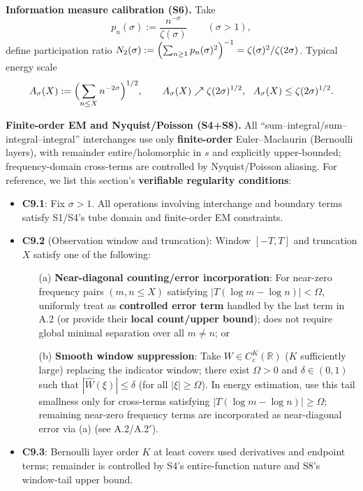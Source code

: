 \documentclass[11pt,a4paper]{article}
\theoremstyle{remark}
\begin{document}
\textbf{Information measure calibration (S6).} Take
\begin{equation}
p_n(\sigma):=\frac{n^{-\sigma}}{\zeta(\sigma)}\qquad(\sigma>1),
\end{equation}
define participation ratio $N_2(\sigma):=\Bigl(\sum_{n\ge1}p_n(\sigma)^2\Bigr)^{-1}=\zeta(\sigma)^2/\zeta(2\sigma)$. Typical energy scale
\begin{equation}
A_\sigma(X):=\Bigl(\sum_{n\le X}n^{-2\sigma}\Bigr)^{1/2},\qquad A_\sigma(X)\nearrow \zeta(2\sigma)^{1/2},\ \ A_\sigma(X)\le \zeta(2\sigma)^{1/2}.
\end{equation}

\textbf{Finite-order EM and Nyquist/Poisson (S4+S8).} All ``sum--integral/sum--integral--integral'' interchanges use only \textbf{finite-order} Euler--Maclaurin (Bernoulli layers), with remainder entire/holomorphic in $s$ and explicitly upper-bounded; frequency-domain cross-terms are controlled by Nyquist/Poisson aliasing. For reference, we list this section's \textbf{verifiable regularity conditions}:

\begin{itemize}
\item \textbf{C9.1}: Fix $\sigma>1$. All operations involving interchange and boundary terms satisfy S1/S4's tube domain and finite-order EM constraints.

\item \textbf{C9.2} (Observation window and truncation): Window $[-T,T]$ and truncation $X$ satisfy one of the following:
\begin{enumerate}
\item[(a)] \textbf{Near-diagonal counting/error incorporation}: For near-zero frequency pairs $(m,n\le X)$ satisfying $|T(\log m-\log n)|<\Omega$, uniformly treat as \textbf{controlled error term} handled by the last term in A.2 (or provide their \textbf{local count/upper bound}); does not require global minimal separation over all $m\ne n$; or

\item[(b)] \textbf{Smooth window suppression}: Take $W\in C^K_c(\mathbb{R})$ ($K$ sufficiently large) replacing the indicator window; there exist $\Omega>0$ and $\delta\in(0,1)$ such that $|\widehat{W}(\xi)|\le \delta$ (for all $|\xi|\ge \Omega$). In energy estimation, use this tail smallness only for cross-terms satisfying $|T(\log m-\log n)|\ge \Omega$; remaining near-zero frequency terms are incorporated as near-diagonal error via (a) (see A.2/A.2$'$).
\end{enumerate}

\item \textbf{C9.3}: Bernoulli layer order $K$ at least covers used derivatives and endpoint terms; remainder is controlled by S4's entire-function nature and S8's window-tail upper bound.
\end{itemize}
\end{document}
